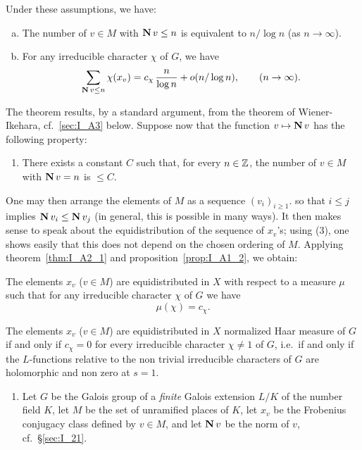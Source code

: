 \begin{subappendices}
Under these assumptions, we have:
\begin{thm}\label{thm:I_A2_1}
\begin{enumerate}[(a)]
\item The number of $v \in M$ with $\operatorname{\mathbf{N}} v \le n$ is equivalent to $n/\log
	n$ (as $n \to \infty$).
\item For any irreducible character $\chi$ of $G$, we have
	$$ \sum_{\operatorname{\mathbf{N}} v\le n} \chi(x_v) = c_\chi \, \frac{n}{\log n} +
	o(n/\log n), \qquad (n \to \infty). $$
\end{enumerate}
\end{thm}\label{thm:I_A2_2}
The theorem results, by a standard argument, from the theorem of
Wiener-Ikehara, cf.\ \ref{sec:I_A3} below.
Suppose now that the function $v \mapsto \operatorname{\mathbf{N}} v$ has the following
property:

\begin{enumerate}[resume*=Lfunc_hyp]
\item\dpage
	There exists a constant $C$ such that, for every $n \in \mathbb{Z}$, the number
	of $v \in M$ with $\operatorname{\mathbf{N}} v = n$ is $\le C$.
\end{enumerate}
One may then arrange the elements of $M$ as a sequence
$(v_i)_{i\ge 1}$. so that $i \le j$ implies $\operatorname{\mathbf{N}} v_i \le \operatorname{\mathbf{N}} v_j$ (in
general, this is possible in many ways). It then makes sense to speak about the
equidistribution of the sequence of $x_v$'s; using (3), one shows easily that
this does not depend on the chosen ordering of $M$. Applying
theorem~\ref{thm:I_A2_1} and proposition~\ref{prop:I_A1_2}, we obtain:
\begin{thm}
The elements $x_v$ ($v \in M$) are equidistributed in $X$
with respect to a measure $\mu$ such that for any irreducible character
$\chi$ of $G$ we have
$$ \mu(\chi) = c_\chi. $$
\end{thm}
\begin{cor}
	The elements $x_v$ ($v \in M$) are equidistributed in $X$
	normalized Haar measure of $G$ if and only if $c_\chi = 0$ for every
	irreducible character $\chi \ne 1$ of $G$, i.e.\, if and only if the
	$L$-functions relative to the non trivial irreducible characters of $G$
	are holomorphic and non zero at $s = 1$.
\end{cor}

\begin{ex}
\begin{enumerate}[series=ex_IA3]
\item Let $G$ be the Galois group of a \emph{finite} Galois extension
	$L/K$ of the number field $K$, let $M$ be the set of unramified places
	of $K$, let $x_v$ be the Frobenius conjugacy class defined by $v \in M$,
	and let $\operatorname{\mathbf{N}} v$ be the norm of $v$, cf.\ \S\ref{sec:I_21}.


\end{enumerate}
\end{ex}
\end{subappendices}
